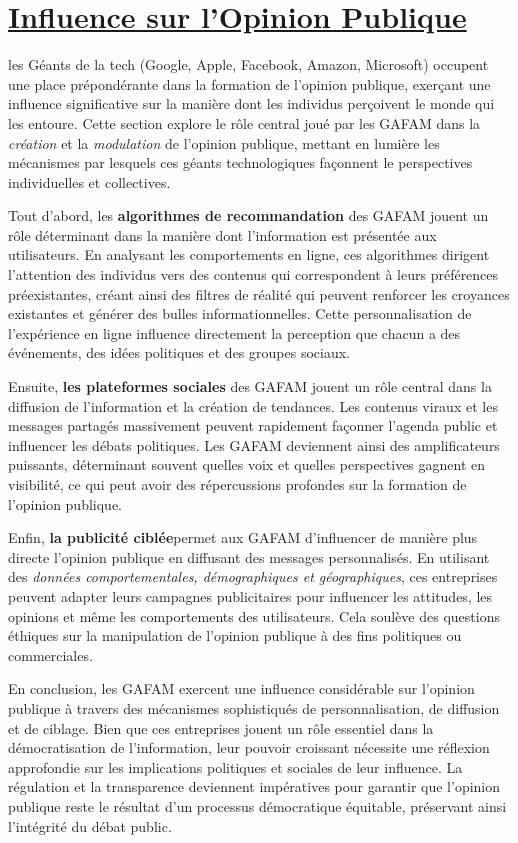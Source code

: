 \documentclass[12pt,a4paper]{article} %
\begin{document}
	\section{\underline{Influence sur l'Opinion Publique}}
	 
	 les Géants de la tech (Google, Apple, Facebook, Amazon, Microsoft) occupent une place prépondérante dans la formation de l'opinion publique, exerçant une influence significative sur la manière dont les individus perçoivent le monde qui les entoure. Cette section explore le rôle central joué par les GAFAM dans la \textit{création} et la \textit{modulation} de l'opinion publique, mettant en lumière les mécanismes par lesquels ces géants technologiques façonnent le  perspectives individuelles et collectives.
	
	Tout d’abord, les \textbf{algorithmes de recommandation} des GAFAM jouent un rôle déterminant dans la manière dont l'information est présentée aux utilisateurs. En analysant les comportements en ligne, ces algorithmes dirigent l'attention des individus vers des contenus qui correspondent à leurs préférences préexistantes, créant ainsi des filtres de réalité qui peuvent renforcer les croyances existantes et générer des bulles informationnelles. Cette personnalisation de l'expérience en ligne influence directement la perception que chacun a des événements, des idées politiques et des groupes sociaux.
	
	Ensuite, \textbf{les plateformes sociales} des GAFAM jouent un rôle central dans la diffusion de l'information et la création de tendances. Les contenus viraux et les messages partagés massivement peuvent rapidement façonner l'agenda public et influencer les débats politiques. Les GAFAM deviennent ainsi des amplificateurs puissants, déterminant souvent quelles voix et quelles perspectives gagnent en visibilité, ce qui peut avoir des répercussions profondes sur la formation de l'opinion publique.
	
	Enfin, \textbf{la publicité ciblée}permet aux GAFAM d'influencer de manière plus directe l'opinion publique en diffusant des messages personnalisés. En utilisant des \textit{ données comportementales, démographiques et géographiques}, ces entreprises peuvent adapter leurs campagnes publicitaires pour influencer les attitudes, les opinions et même les comportements des utilisateurs. Cela soulève des questions éthiques sur la manipulation de l'opinion publique à des fins politiques ou commerciales.
	
	En conclusion, les GAFAM exercent une influence considérable sur l'opinion publique à travers des mécanismes sophistiqués de personnalisation, de diffusion et de ciblage. Bien que ces entreprises jouent un rôle essentiel dans la démocratisation de l'information, leur pouvoir croissant nécessite une réflexion approfondie sur les implications politiques et sociales de leur influence. La régulation et la transparence deviennent impératives pour garantir que l'opinion publique reste le résultat d'un processus démocratique équitable, préservant ainsi l'intégrité du débat public.
	
\end{document}
